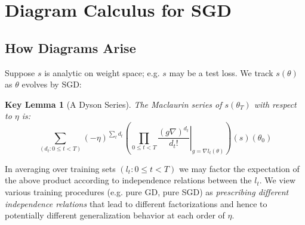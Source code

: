 \documentclass{article}
\newtheorem{klem}{Key Lemma}
\begin{document}
\section{Diagram Calculus for SGD}


    \subsection{How Diagrams Arise}
        Suppose $s$ is analytic on weight space; e.g. $s$ may be a test loss.
        We track $s(\theta)$ as $\theta$ evolves by SGD:
        \begin{klem}[A Dyson Series] \label{lem:dyson}
            The Maclaurin series of $s(\theta_T)$ with respect to $\eta$ is:
            \begin{equation}\label{eq:dyson}
                \sum_{(d_t: 0\leq t<T)}
                (-\eta)^{\sum_t d_t}
                \left(
                    \prod_{0 \leq t < T}
                        \left.  \frac{(g \nabla)^{d_t}}{d_t!} \right|_{g=\nabla l_t(\theta)}
                \right)
                (s) (\theta_0)
            \end{equation}
        \end{klem}
        In averaging over training sets $(l_t: 0\leq t<T)$ we may factor the
        expectation of the above product according to independence relations
        between the $l_t$.  We view various training procedures (e.g. pure GD,
        pure SGD) as \emph{prescribing different independence relations} that
        lead to different factorizations and hence to potentially different
        generalization behavior at each order of $\eta$.
    
\end{document}
